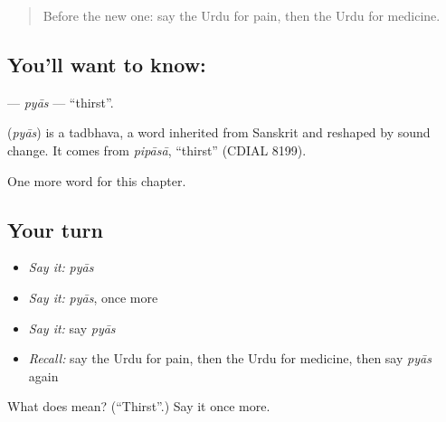\begin{quote}
Before the new one: say the Urdu for pain, then the Urdu for medicine.
\end{quote}

\subsection*{You'll want to know: }
\textbf{} — \emph{pyās} — \textquotedblleft{}thirst\textquotedblright{}.

\begin{cousinweb}
\textbf{} (\emph{pyās}) is a tadbhava, a word inherited from Sanskrit and reshaped by sound change. It comes from \emph{pipāsā}, \textquotedblleft{}thirst\textquotedblright{} (CDIAL 8199).
\end{cousinweb}

\begin{grammarlens}[title={What you've built}]
One more word for this chapter.
\end{grammarlens}

\subsection*{Your turn}
\begin{itemize}
\raggedright
  \item \emph{Say it:} \emph{pyās}
  \item \emph{Say it:} \emph{pyās}, once more
  \item \emph{Say it:} say \emph{pyās}
  \item \emph{Recall:} say the Urdu for pain, then the Urdu for medicine, then say \emph{pyās} again
\end{itemize}

\begin{tcolorbox}[breakable,colback=teal!4,colframe=teal!35!black,title={Before you move on}]
What does  mean? (\textquotedblleft{}Thirst\textquotedblright{}.) Say it once more.
\end{tcolorbox}
